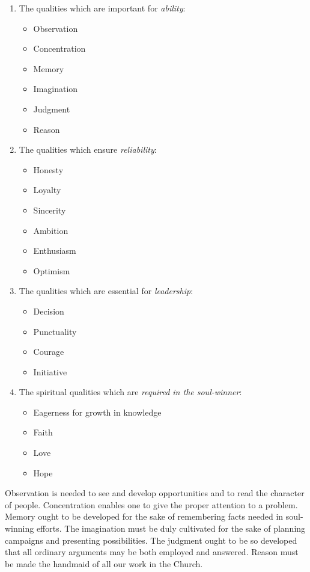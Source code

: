 \documentclass[
]{book}
\providecommand{\tightlist}{%
  \setlength{\itemsep}{0pt}\setlength{\parskip}{0pt}}
\begin{document}
\begin{enumerate}
\def\labelenumi{\arabic{enumi}.}
\tightlist
\item
  The qualities which are important for \emph{ability}:

  \begin{itemize}
  \tightlist
  \item
    Observation
  \item
    Concentration
  \item
    Memory
  \item
    Imagination
  \item
    Judgment
  \item
    Reason
  \end{itemize}
\item
  The qualities which ensure \emph{reliability}:

  \begin{itemize}
  \tightlist
  \item
    Honesty
  \item
    Loyalty
  \item
    Sincerity
  \item
    Ambition
  \item
    Enthusiasm
  \item
    Optimism
  \end{itemize}
\item
  The qualities which are essential for \emph{leadership}:

  \begin{itemize}
  \tightlist
  \item
    Decision
  \item
    Punctuality
  \item
    Courage
  \item
    Initiative
  \end{itemize}
\item
  The spiritual qualities which are \emph{required in the soul-winner}:

  \begin{itemize}
  \tightlist
  \item
    Eagerness for growth in knowledge
  \item
    Faith
  \item
    Love
  \item
    Hope
  \end{itemize}
\end{enumerate}

Observation is needed to see and develop opportunities and to read the character of people. Concentration enables one to give the proper attention to a problem. Memory ought to be developed for the sake of remembering facts needed in soul-winning efforts. The imagination must be duly cultivated for the sake of planning campaigns and presenting possibilities. The judgment ought to be so developed that all ordinary arguments may be both employed and answered. Reason must be made the handmaid of all our work in the Church.
\end{document}
